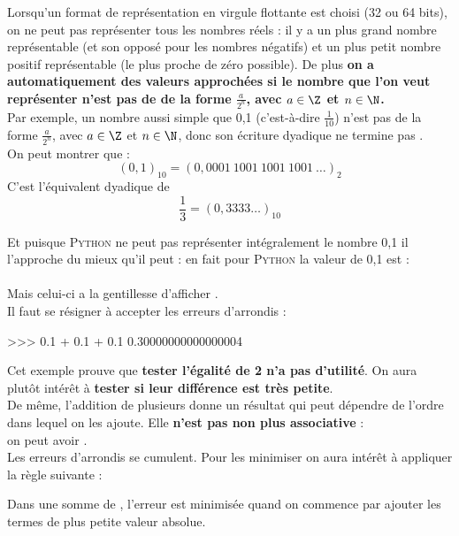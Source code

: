 \documentclass[a4paper,12pt,french]{book}
\begin{document}
Lorsqu'un format de représentation en virgule flottante est choisi (32 ou 64 bits), on ne peut pas représenter tous les nombres réels : il y a un
plus grand nombre représentable (et son opposé pour les nombres négatifs) et un \og plus petit nombre positif représentable\fg{} (le plus proche de
zéro possible). De plus \textbf{ on a automatiquement des valeurs approchées si le nombre que l'on veut représenter n'est pas de de la forme
$\frac{a}{2^n}$, avec $a\in\Z$ et $n\in\N$.}\\

Par exemple, un nombre aussi simple que 0,1 (c'est-à-dire $\frac{1}{10}$) n'est pas de la forme $\frac{a}{2^n}$, avec $a\in\Z$ et $n\in\N$, donc son
écriture dyadique ne termine pas .\\
On peut montrer que :$$(0,1)_{10} = (0,0001\ 1001\ 1001\ 1001\ \ldots)_2$$
C'est l'équivalent dyadique de $$\dfrac{1}{3}=(0,3333\ldots)_{10}$$

Et puisque \textsc{Python} ne peut pas représenter intégralement le nombre 0,1 il l'approche du mieux qu'il peut : en fait pour \textsc{Python} la
valeur de 0,1 est :\\

\\

Mais celui-ci a la gentillesse d'afficher .\\

Il faut se résigner à accepter les erreurs d'arrondis :
\begin{pythonshell}
>>> 0.1 + 0.1 + 0.1
0.30000000000000004
\end{pythonshell}


Cet exemple prouve que \textbf{tester l'égalité de 2  n'a pas d'utilité}. On aura plutôt intérêt à \textbf{tester si leur différence est
très petite}.\\

De même, l'addition de plusieurs  donne un résultat qui peut dépendre de l'ordre dans lequel on les ajoute.
Elle \textbf{n'est pas non plus associative} : \\

on peut avoir .\\


Les erreurs d'arrondis se cumulent. Pour les minimiser on aura intérêt à appliquer la règle suivante :

\begin{propriete}
Dans une somme de , l'erreur est minimisée quand on commence par ajouter les termes de plus petite valeur absolue.
\end{propriete}
\end{document}

